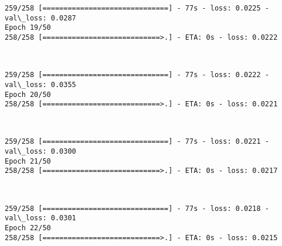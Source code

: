 \documentclass[11pt]{article}
\begin{document}
    \begin{Verbatim}[commandchars=\\\{\}]
259/258 [==============================] - 77s - loss: 0.0225 - val\_loss: 0.0287
Epoch 19/50
258/258 [============================>.] - ETA: 0s - loss: 0.0222
    \end{Verbatim}

    \begin{center}
    \end{center}
    { \hspace*{\fill} \\}
    
    \begin{Verbatim}[commandchars=\\\{\}]
259/258 [==============================] - 77s - loss: 0.0222 - val\_loss: 0.0355
Epoch 20/50
258/258 [============================>.] - ETA: 0s - loss: 0.0221
    \end{Verbatim}

    \begin{center}
    \end{center}
    { \hspace*{\fill} \\}
    
    \begin{Verbatim}[commandchars=\\\{\}]
259/258 [==============================] - 77s - loss: 0.0221 - val\_loss: 0.0300
Epoch 21/50
258/258 [============================>.] - ETA: 0s - loss: 0.0217
    \end{Verbatim}

    \begin{center}
    \end{center}
    { \hspace*{\fill} \\}
    
    \begin{Verbatim}[commandchars=\\\{\}]
259/258 [==============================] - 77s - loss: 0.0218 - val\_loss: 0.0301
Epoch 22/50
258/258 [============================>.] - ETA: 0s - loss: 0.0215
    \end{Verbatim}

    \begin{center}
    \end{center}
    { \hspace*{\fill} \\}
    
\end{document}
